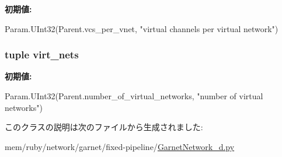 \label{classGarnetNetwork__d_1_1GarnetRouter__d_a2bb2221cda9b94b6a0c2944d8a12f31e}
{\bfseries 初期値:}
\begin{DoxyCode}
Param.UInt32(Parent.vcs_per_vnet,
                              "virtual channels per virtual network")
\end{DoxyCode}
\hypertarget{classGarnetNetwork__d_1_1GarnetRouter__d_a84c7a415611bc1b55aa5e7fd9e9601e8}{
\subsubsection[{virt\_\-nets}]{\setlength{\rightskip}{0pt plus 5cm}tuple {\bf virt\_\-nets}}}
\label{classGarnetNetwork__d_1_1GarnetRouter__d_a84c7a415611bc1b55aa5e7fd9e9601e8}
{\bfseries 初期値:}
\begin{DoxyCode}
Param.UInt32(Parent.number_of_virtual_networks,
                          "number of virtual networks")
\end{DoxyCode}


このクラスの説明は次のファイルから生成されました:\begin{DoxyCompactItemize}
\item 
mem/ruby/network/garnet/fixed-\/pipeline/\hyperlink{GarnetNetwork__d_8py}{GarnetNetwork\_\-d.py}\end{DoxyCompactItemize}
